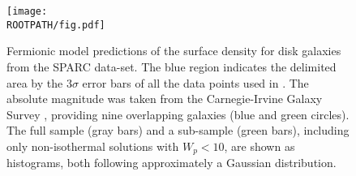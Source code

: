 \begin{figure}%
	\centering%
	\texttt{[image: \\ROOTPATH/fig.pdf]}
	\caption{Fermionic model predictions of the surface density for disk galaxies from the SPARC data-set. The blue region indicates the delimited area by the $3\sigma$ error bars of all the data points used in \citet{2009MNRAS.397.1169D}. The absolute magnitude was taken from the Carnegie-Irvine Galaxy Survey \citep{2011ApJS..197...21H}, providing nine overlapping galaxies (blue and green circles). The full sample (gray bars) and a sub-sample (green bars), including only non-isothermal solutions with $W_p < 10$, are shown as histograms, both following approximately a Gaussian distribution.}%
	\label{fig:SPARC:Donato}%
\end{figure}